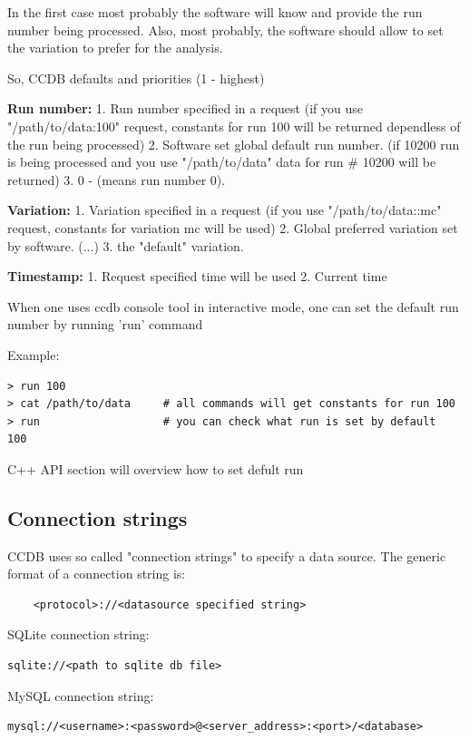 \documentclass{article}
\begin{document}
In the first case most probably the software will know and provide the run 
number being processed. Also, most probably, the software should allow to set 
the variation to prefer for the analysis.

So, CCDB defaults and priorities (1 - highest)

\textbf{Run number:}
1. Run number specified in a request
(if you use "/path/to/data:100" request, constants for run 100 will be returned 
dependless of the run being processed)
2. Software set global default run number.
(if 10200 run is being processed and you use "/path/to/data" data for run \# 10200 will be returned)
3. 0 - (means run number 0).

\textbf{Variation:}
1. Variation specified in a request
(if you use "/path/to/data::mc" request, constants for variation mc will be used)
2. Global preferred variation set by software.
(...)
3. the "default" variation.


\textbf{Timestamp:}
1. Request specified time will be used
2. Current time

When one uses ccdb console tool in interactive mode, one can set the default run number by running 'run' command

Example:
\begin{verbatim}
> run 100
> cat /path/to/data     # all commands will get constants for run 100
> run                   # you can check what run is set by default
100
\end{verbatim}
C++ API section will overview how to set defult run


\subsection{Connection strings}\label{sec:connection}


CCDB uses so called "connection strings" to specify a data source.
The generic format of a connection string is:
\begin{verbatim}
    <protocol>://<datasource specified string>
\end{verbatim}

SQLite connection string:
\begin{verbatim}
sqlite://<path to sqlite db file>
\end{verbatim}

MySQL connection string:
\begin{verbatim}
mysql://<username>:<password>@<server_address>:<port>/<database>
\end{verbatim}
\end{document}
